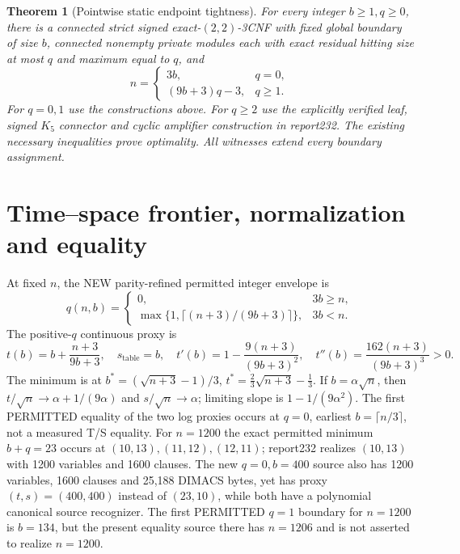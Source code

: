 \documentclass[11pt]{article}
\newtheorem{theorem}{Theorem}
\begin{document}
\begin{theorem}[Pointwise static endpoint tightness]
For every integer $b\ge1,q\ge0$, there is a connected strict signed exact-$(2,2)$-3CNF with fixed global boundary of size $b$, connected nonempty private modules each with exact residual hitting size at most $q$ and maximum equal to $q$, and
\[
n=\begin{cases}3b,&q=0,\\(9b+3)q-3,&q\ge1.\end{cases}
\]
For $q=0,1$ use the constructions above. For $q\ge2$ use the explicitly verified leaf, signed $K_5$ connector and cyclic amplifier construction in report232. The existing necessary inequalities prove optimality. All witnesses extend every boundary assignment.
\end{theorem}

\section{Time--space frontier, normalization and equality}
At fixed $n$, the NEW parity-refined permitted integer envelope is
\[
q(n,b)=\begin{cases}0,&3b\ge n,\\\max\{1,\lceil(n+3)/(9b+3)\rceil\},&3b<n.\end{cases}
\]
The positive-$q$ continuous proxy is
\[
t(b)=b+\frac{n+3}{9b+3},\quad s_{\mathrm{table}}=b,\quad
t'(b)=1-\frac{9(n+3)}{(9b+3)^2},\quad
t''(b)=\frac{162(n+3)}{(9b+3)^3}>0.
\]
The minimum is at $b^*=(\sqrt{n+3}-1)/3$, $t^*=\frac23\sqrt{n+3}-\frac13$.
If $b=\alpha\sqrt n$, then $t/\sqrt n\to\alpha+1/(9\alpha)$ and $s/\sqrt n\to\alpha$; limiting slope is $1-1/(9\alpha^2)$. The first PERMITTED equality of the two log proxies occurs at $q=0$, earliest $b=\lceil n/3\rceil$, not a measured T/S equality. For $n=1200$ the exact permitted minimum $b+q=23$ occurs at $(10,13),(11,12),(12,11)$; report232 realizes $(10,13)$ with 1200 variables and 1600 clauses. The new $q=0,b=400$ source also has 1200 variables, 1600 clauses and 25,188 DIMACS bytes, yet has proxy $(t,s)=(400,400)$ instead of $(23,10)$, while both have a polynomial canonical source recognizer. The first PERMITTED $q=1$ boundary for $n=1200$ is $b=134$, but the present equality source there has $n=1206$ and is not asserted to realize $n=1200$.
\end{document}
